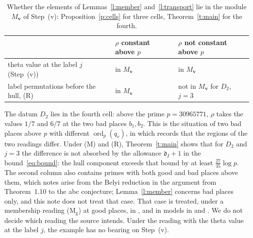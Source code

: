 \documentclass[11pt]{amsart}
\theoremstyle{remark}
\newcommand{\dd}{\mathfrak d}
\newcommand{\bv}{\mathbf v}
\begin{document}
\begin{table}[ht]
\centering
\begin{tabular}{@{}lll@{}}
\toprule
 & $\rho$ constant above $p$ & $\rho$ not constant above $p$\\
\midrule
theta value at the label $j$ (Step~(v)) & in $M_{\bv}$ & in $M_{\bv}$\\
label permutations before the hull, \textup{(R)} & in $M_{\bv}$ & not in $M_{\bv}$ for $D_2$, $j=3$\\
\bottomrule
\end{tabular}
\caption{Whether the elements of Lemmas~\ref{l:member} and~\ref{l:transport} lie in the module $M_{\bv}$ of
Step~(v): Proposition~\ref{p:cells} for three cells, Theorem~\ref{t:main} for the fourth.}\label{tab:cells}
\end{table}

The datum $D_2$ lies in the fourth cell: above the prime $p=30965771$, $\rho$ takes the values
$1/7$ and $6/7$ at the two bad places $b_1,b_2$. This is the situation of two bad places above $p$ with different
$\operatorname{ord}_p(q_v)$, in which \cite{LANAiut} records that the regions of the two readings differ.
Under \textup{(M)} and \textup{(R)}, Theorem~\ref{t:main} shows that for $D_2$ and $j=3$ the difference is not
absorbed by the allowance $\dd_I+1$ in the bound~\eqref{eq:bound}: the hull component exceeds that bound by at
least $\tfrac{27}{35}\log p$. The second column also contains primes with both
good and bad places above them, which \cite{LANAiut} notes arise from the Belyi reduction in the argument from
Theorem~1.10 to the abc conjecture; Lemma~\ref{l:member} concerns bad places only, and this note does not treat that case.
That case is treated, under a membership reading (M$_{\mathrm g}$) at good places, in \cite[Prop.~1 (GB),
Thm.~3]{Cat}, and in models in \cite[Prop.~13.3, Thm.~14.3(iv)]{II} and \cite[Ex.~3.7]{RF}. We do
not decide which reading the source intends. Under the reading with the theta value at the label $j$, the
example has no bearing on Step~(v).

\smallskip
\end{document}
